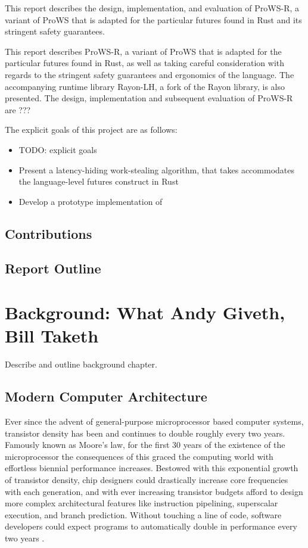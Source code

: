 \documentclass[bsc,frontabs,singlespacing,parskip,deptreport,normalheadings]{infthesis}
\begin{document}
This report describes the
design, implementation, and evaluation of ProWS-R, a variant of ProWS that is
adapted for the particular futures found in Rust and its stringent safety
guarantees.

This report describes ProWS-R, a variant of ProWS that is adapted for the
particular futures found in Rust, as well as taking careful consideration with
regards to the stringent safety guarantees and ergonomics of the language. The
accompanying runtime library Rayon-LH, a fork of the Rayon library, is also
presented. The design, implementation and subsequent evaluation of ProWS-R are
???

The explicit goals of this project are as follows:

\begin{itemize}
    \item TODO: explicit goals
    \item Present a latency-hiding work-stealing algorithm, that takes
        accommodates the language-level futures construct in Rust
    \item Develop a prototype implementation of 
\end{itemize}

\section{Contributions}

\section{Report Outline}


\chapter{Background: What Andy Giveth, Bill Taketh}

Describe and outline background chapter.

\section{Modern Computer Architecture}

Ever since the advent of general-purpose microprocessor based computer systems,
transistor density has been and continues to double roughly every two years.
Famously known as Moore's law, for the first 30 years of the existence of the
microprocessor the consequences of this graced the computing world with
effortless biennial performance increases. Bestowed with this exponential growth
of transistor density, chip designers could drastically increase core
frequencies with each generation, and with ever increasing transistor budgets
afford to design more complex architectural features like instruction
pipelining, superscalar execution, and branch prediction. Without touching a
line of code, software developers could expect programs to automatically double
in performance every two years \cite{hennessy_new_2019}.
\end{document}
